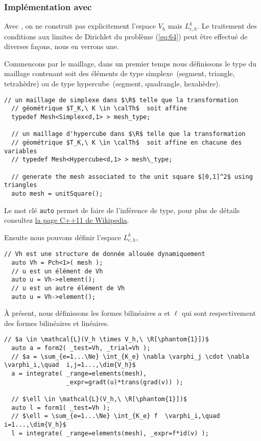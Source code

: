 \subsubsection{Implémentation avec \Feel}
\label{sec:impl-en-feel++}

Avec \Feel, on ne construit pas explicitement l'espace $V_h$ mais
$L^k_{c,h}$. Le traitement des conditions aux limites de Dirichlet du problème
(\ref{eq:64}) peut être effectué de diverses fa\c {c}ons, nous en verrons une.

Commencons par le maillage, dans un premier temps nous définissons le type du
maillage contenant soit des éléments de type simplexe~(segment, triangle,
tetrahèdre) ou de type hypercube~(segment, quadrangle, hexahèdre).

\begin{lstlisting}[caption={Maillage $\calTh$}]
  // un maillage de simplexe dans $\R$ telle que la transformation
  // géométrique $T_K,\ K \in \calTh$  soit affine
  typedef Mesh<Simplex<d,1> > mesh_type;

  // un maillage d'hypercube dans $\R$ telle que la transformation
  // géométrique $T_K,\ K \in \calTh$  soit affine en chacune des variables
  // typedef Mesh<Hypercube<d,1> > mesh\_type;

  // generate the mesh associated to the unit square $[0,1]^2$ using triangles
  auto mesh = unitSquare();
\end{lstlisting}
\begin{remark}
  \label{rem:25}
  Le mot clé \texttt{auto} permet de faire de l'inférence de type, pour plus
  de détails consultez
  \href{http://fr.wikipedia.org/wiki/C%2B%2B11#Inf.C3.A9rence_de_types}{la page C++11 de Wikipedia}.
\end{remark}
Ensuite nous pouvons définir l'espace $L^k_{c,h}$,
\begin{lstlisting}[caption={$L^k_{c,h}$}]
  // Vh est une structure de donnée allouée dynamiquement
  auto Vh = Pch<1>( mesh );
  // u est un élément de Vh
  auto u = Vh->element();
  // u est un autre élément de Vh
  auto u = Vh->element();
\end{lstlisting}

À présent, nous définissons les formes bilinéaires $a$ et $\ell$ qui sont
respectivement des formes bilinéaires et linéaires.

\begin{lstlisting}[caption={Définitions de $a$ et $\ell$}]
  // $a \in \mathcal{L}(V_h \times V_h,\ \R[\phantom{1}])$
  auto a = form2( _test=Vh, _trial=Vh );
  // $a = \sum_{e=1...\Ne} \int_{K_e} \nabla \varphi_j \cdot \nabla \varphi_i,\quad  i,j=1...,\dim{V_h}$
  a = integrate( _range=elements(mesh),
                 _expr=gradt(u)*trans(grad(v)) );

  // $\ell \in \mathcal{L}(V_h,\ \R[\phantom{1}])$
  auto l = form1( _test=Vh );
  // $\ell = \sum_{e=1...\Ne} \int_{K_e} f  \varphi_i,\quad  i=1...,\dim{V_h}$
  l = integrate( _range=elements(mesh), _expr=f*id(v) );
\end{lstlisting}

